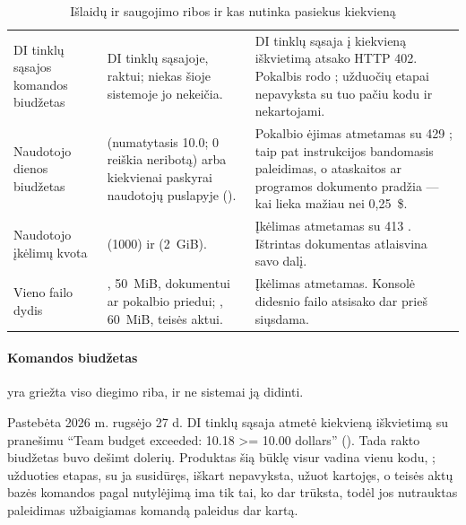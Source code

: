 \begin{table}[H]
\caption{Išlaidų ir saugojimo ribos ir kas nutinka pasiekus kiekvieną}\label{tab:ops:limits}
\begin{tabularx}{\textwidth}{@{}L{30mm}L{36mm}Y@{}}
\toprule
{} &  &  \\
\midrule
DI tinklų sąsajos komandos biudžetas & DI tinklų sąsajoje, raktui; niekas šioje sistemoje jo nekeičia. & DI tinklų sąsaja į kiekvieną iškvietimą atsako HTTP 402. Pokalbis rodo ; užduočių etapai nepavyksta su tuo pačiu kodu ir nekartojami. \\
Naudotojo dienos biudžetas &  (numatytasis 10.0; 0 reiškia neribotą) arba kiekvienai paskyrai naudotojų puslapyje (). & Pokalbio ėjimas atmetamas su 429 ; taip pat instrukcijos bandomasis paleidimas, o ataskaitos ar programos dokumento pradžia --- kai lieka mažiau nei 0,25~\$. \\
Naudotojo įkėlimų kvota &  (1000) ir  (2~GiB). & Įkėlimas atmetamas su 413 . Ištrintas dokumentas atlaisvina savo dalį. \\
Vieno failo dydis & , 50~MiB, dokumentui ar pokalbio priedui; , 60~MiB, teisės aktui. & Įkėlimas atmetamas. Konsolė didesnio failo atsisako dar prieš siųsdama. \\
\bottomrule
\end{tabularx}
\end{table}

\paragraph{Komandos biudžetas} yra griežta viso diegimo riba, ir ne sistemai ją didinti.

\begin{lessonbox}{Pastebėta 2026 m. rugsėjo 27 d.}
DI tinklų sąsaja atmetė kiekvieną iškvietimą su pranešimu \enquote{Team budget exceeded: 10.18 >=
10.00 dollars} (). Tada rakto biudžetas buvo dešimt dolerių. Produktas
šią būklę visur vadina vienu kodu, ; užduoties etapas, su ja susidūręs,
iškart nepavyksta, užuot kartojęs, o teisės aktų bazės komandos pagal nutylėjimą ima tik tai, ko
dar trūksta, todėl jos nutrauktas paleidimas užbaigiamas komandą paleidus dar kartą.
\end{lessonbox}

